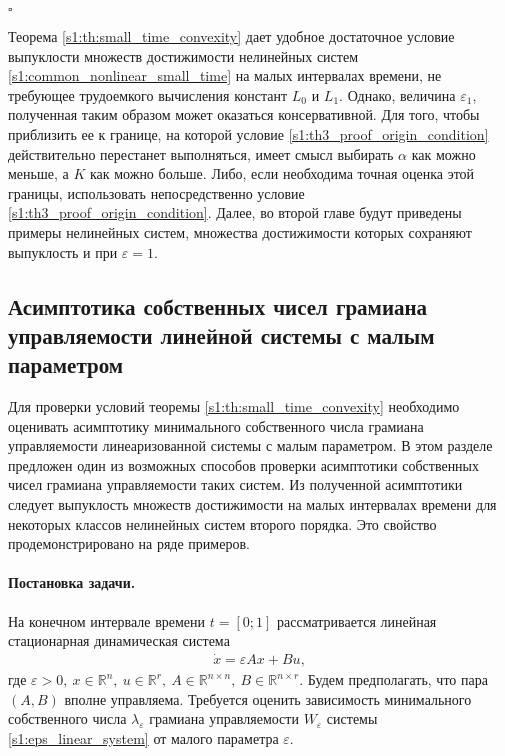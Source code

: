 \documentclass[../main.tex]{subfiles}
\begin{document}
 \hfill$\square$\\[1ex]%
 
 \begin{zam}
 	Теорема \ref{s1:th:small_time_convexity} дает удобное достаточное условие выпуклости множеств достижимости нелинейных систем \eqref{s1:common_nonlinear_small_time} на малых интервалах времени, не требующее трудоемкого вычисления констант $L_0$ и $L_1$.
 	Однако, величина $\varepsilon_1$, полученная таким образом может оказаться консервативной. 
 	Для того, чтобы приблизить ее к границе, на которой условие \eqref{s1:th3_proof_origin_condition} действительно перестанет выполняться, имеет смысл выбирать $\alpha$ как можно меньше, а $K$ как можно больше. 
 	Либо, если необходима точная оценка этой границы, использовать непосредственно условие \eqref{s1:th3_proof_origin_condition}.
 	Далее, во второй главе будут приведены примеры нелинейных систем, множества достижимости которых сохраняют выпуклость и при $ \varepsilon = 1$.
 \end{zam}
 \subsection{Асимптотика собственных чисел грамиана управляемости линейной системы с малым параметром} 
Для проверки условий теоремы \ref{s1:th:small_time_convexity} необходимо оценивать асимптотику минимального собственного числа грамиана управляемости линеаризованной системы с малым параметром.
В этом разделе предложен один из возможных способов проверки асимптотики собственных чисел грамиана управляемости таких систем.
Из полученной асимптотики следует выпуклость множеств достижимости на малых интервалах времени для некоторых классов нелинейных систем второго порядка.
Это свойство продемонстрировано на ряде примеров.

\paragraph{Постановка задачи.} На конечном интервале времени $ t = [0;1] $ рассматривается линейная стационарная динамическая система 
\begin{gather}\label{s1:eps_linear_system}
 \dot{x} = \varepsilon A x + Bu, 
\end{gather}
где $ \varepsilon > 0, \ x \in \mathbb{R}^n, \ u \in \mathbb{R}^r, \ A \in \mathbb{R}^{n\times n}, \ B \in \mathbb{R}^{n\times r} $.
Будем предполагать, что пара $ \left( A, B\right) $ вполне управляема.
Требуется оценить зависимость минимального собственного числа $ \lambda_{\varepsilon} $ грамиана управляемости $ W_{\varepsilon} $ системы \eqref{s1:eps_linear_system} от малого параметра $ \varepsilon $.
\end{document}
